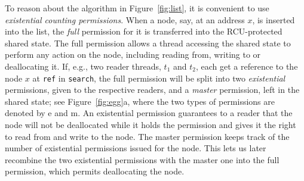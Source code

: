 To reason about the algorithm in Figure~\ref{fig:list}, it is convenient to use
{\em existential counting permissions}. When a node, say, at an address $x$, is
inserted into the list, the {\em full} permission for it is transferred into the
RCU-protected shared state. The full permission allows a thread accessing the
shared state to perform any action on the node, including reading from, writing
to or deallocating it. If, e.g., two reader threads, $t_1$ and $t_2$, each get a
reference to the node $x$ at {\tt ref} in {\tt search}, the full permission will
be split into two {\em existential} permissions, given to the respective
readers, and a {\em master} permission, left in the shared state; see
Figure~\ref{fig:egg}a, where the two types of permissions are denoted by {\sf
  e} and {\sf m}.  An existential permission guarantees to a reader that the
node will not be deallocated while it holds the permission and gives it the
right to read from and write to the node.  The master permission keeps track of
the number of existential permissions issued for the node. This lets us later
recombine the two existential permissions with the master one into the full
permission, which permits deallocating the node.





